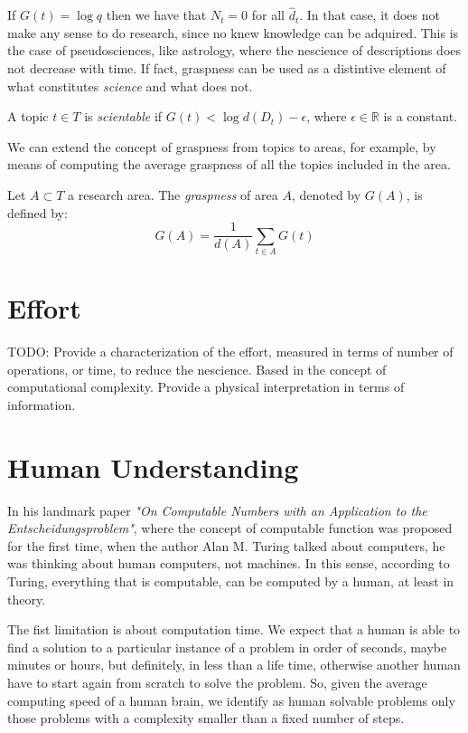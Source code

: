 If $G(t) = \log q$ then we have that $N_t = 0$ for all $\hat{d}_t$. In that case, it does not make any sense to do research, since no knew knowledge can be adquired. This is the case of pseudosciences, like astrology, where the nescience of descriptions does not decrease with time. If fact, graspness can be used as a distintive element of what constitutes \emph{science} and what does not.

\begin{definition}
A topic $t \in T$ is \emph{scientable} if $G(t) < \log d(D_t) - \epsilon$, where $\epsilon \in \mathbb{R}$ is a constant.
\end{definition}

We can extend the concept of graspness from topics to areas, for example, by means of computing the average graspness of all the topics included in the area.

\begin{definition}
Let $A \subset T$ a research area. The \emph{graspness} of area $A$, denoted by $G(A)$, is defined by:
\[
G(A) = \frac{1}{d(A)} \sum_{t \in A} G(t)
\]
\end{definition}

%
%
\section{Effort}

{\color{red} TODO: Provide a characterization of the effort, measured in terms of number of operations, or time, to reduce the nescience. Based in the concept of computational complexity. Provide a physical interpretation in terms of information.}

%
%
\section{Human Understanding}

In his landmark paper \emph{"On Computable Numbers with an Application to the Entscheidungsproblem"}, where the concept of computable function was proposed for the first time, when the author Alan M. Turing talked about computers, he was thinking about human computers, not machines. In this sense, according to Turing, everything that is computable, can be computed by a human, at least in theory.

The fist limitation is about computation time. We expect that a human is able to find a solution to a particular instance of a problem in order of seconds, maybe minutes or hours, but definitely, in less than a life time, otherwise another human have to start again from scratch to solve the problem. So, given the average computing speed of a human brain, we identify as human solvable problems only those problems with a complexity smaller than a fixed number of steps.

